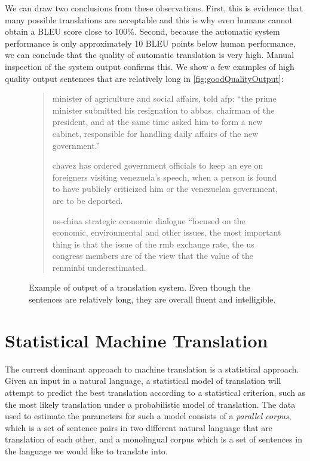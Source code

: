 %
We can draw two conclusions from these observations.
First, this is evidence that many possible translations are
acceptable and this is why even humans cannot obtain a BLEU
score close to 100\%. Second, because the automatic
system performance is only approximately 10 BLEU points below
human performance, we can conclude that the quality of
automatic translation is very high. Manual inspection of the
system output confirms this. We show a few examples of high
quality output sentences that are relatively long in
\autoref{fig:goodQualityOutput}:
%
\begin{figure}
\begin{quote}
      minister of agriculture and social affairs, told afp: ``the prime minister submitted his resignation to abbas, chairman of the president, and at the same time asked him to form a new cabinet, responsible for handling daily affairs of the new government.''

      chavez has ordered government officials to keep an eye on foreigners visiting venezuela's speech, when a person is found to have publicly criticized him or the venezuelan government, are to be deported.

      us-china strategic economic dialogue ``focused on the economic, environmental and other issues, the most important thing is that the issue of the rmb exchange rate, the us congress members are of the view that the value of the renminbi underestimated.
\end{quote}
\caption{Example of output of a translation system. Even though the sentences are relatively long,
they are overall fluent and intelligible.}
\label{fig:goodQualityOutput}
\end{figure}

\section{Statistical Machine Translation}

The current dominant approach to machine translation
is a statistical approach. Given an input in a natural
language, a statistical model of translation will attempt
to predict the best translation according to a statistical
criterion, such as the most likely translation under a
probabilistic model of translation. The data
used to estimate the parameters for such a model consists
of a \emph{parallel corpus}, which is a set of sentence
pairs in two different natural language that are
translation of each other, and a monolingual corpus
which is a set of sentences in the language we would like
to translate into.

